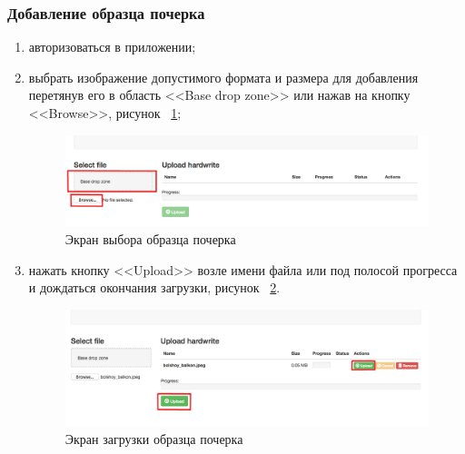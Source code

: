 \subsubsection{Добавление образца почерка}
\label{sec:manpage:client_man:add_sample}
\begin{enumerate}
    \item[1)] авторизоваться в приложении;
    \item[2)] выбрать изображение допустимого формата и размера для добавления перетянув его в область <<Base drop zone>> или нажав на кнопку <<Browse>>, рисунок ~\ref{fig:manpage:client_man:add_sample};
        \begin{figure}[ht]
            \centering
            \includegraphics[width=0.6\textheight]{figures/select_sample_man.png}
            \caption{Экран выбора образца почерка}
            \label{fig:manpage:client_man:add_sample}
        \end{figure}
    \item[3)] нажать кнопку <<Upload>> возле имени файла или под полосой прогресса и дождаться окончания загрузки, рисунок ~\ref{fig:manpage:client_man:upload_sample}.
        \begin{figure}[ht]
            \centering
            \includegraphics[width=0.6\textheight]{figures/upload_sample_man.png}
            \caption{Экран загрузки образца почерка}
            \label{fig:manpage:client_man:upload_sample}
        \end{figure}
\end{enumerate}

